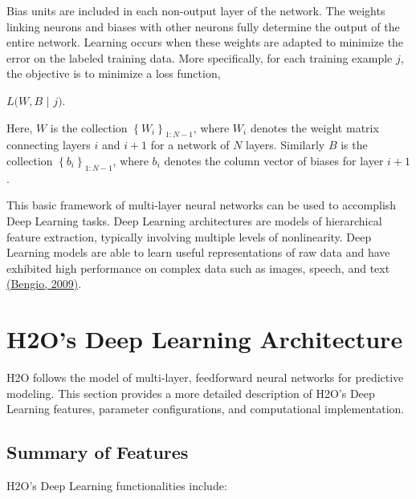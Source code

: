 Bias units are included in each non-output layer of the network. The weights linking neurons and biases with other neurons fully determine the output of the entire network. Learning occurs when these weights are adapted to minimize the error on the labeled training data. More specifically, for each training example $j$, the objective is to minimize a loss function, 
\begin{center}
$L(W,B$ $|$ $j)$.
\end{center}
Here, $W$ is the collection $\left\{W_i\right\}_{1:N-1}$, where $W_i$ denotes the weight matrix connecting layers $i$ and $i+1$ for a network of $N$ layers. Similarly $B$ is the collection $\left\{b_i\right\}_{1:N-1}$, where $b_i$ denotes the column vector of biases for layer $i+1$.

This basic framework of multi-layer neural networks can be used to accomplish Deep Learning tasks. Deep Learning architectures are models of hierarchical feature extraction, typically involving multiple levels of nonlinearity. Deep Learning models are able to learn useful representations of raw data and have exhibited high performance on complex data such as images, speech, and text \href{http://www.iro.umontreal.ca/~lisa/pointeurs/TR1312.pdf}{(Bengio, 2009)}. 

\section{H2O's Deep Learning Architecture} 

H2O follows the model of multi-layer, feedforward neural networks for predictive modeling. This section provides a more detailed description of H2O's Deep Learning features, parameter configurations, and computational implementation.

\newpage
\subsection{Summary of Features} 

H2O's Deep Learning functionalities include: 

